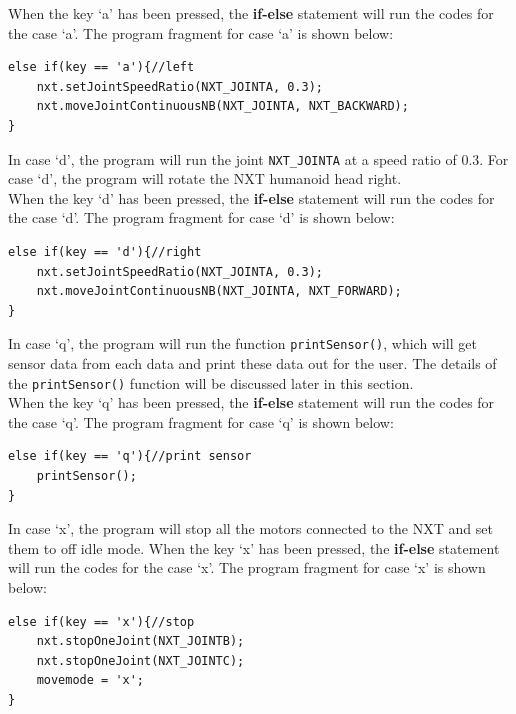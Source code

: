 \documentclass[11pt]{article}
\begin{document}
When the key `a' has been pressed, the {\bf if-else} statement will run 
the codes for the case `a'. The program fragment for case `a' is shown below:
\begin{lstlisting}
else if(key == 'a'){//left
    nxt.setJointSpeedRatio(NXT_JOINTA, 0.3);
    nxt.moveJointContinuousNB(NXT_JOINTA, NXT_BACKWARD);
}
\end{lstlisting}
In case `d', the program will run the joint {\tt NXT\_JOINTA} at a speed ratio 
of 0.3. For case `d', the program will rotate the NXT humanoid head right.\\

When the key `d' has been pressed, the {\bf if-else} statement will run 
the codes for the case `d'. The program fragment for case `d' is shown below:
\begin{lstlisting}
else if(key == 'd'){//right
    nxt.setJointSpeedRatio(NXT_JOINTA, 0.3);
    nxt.moveJointContinuousNB(NXT_JOINTA, NXT_FORWARD);
}
\end{lstlisting}
In case `q', the program will run the function {\tt printSensor()}, which will 
get sensor data from each data and print these data out for the user. The details 
of the {\tt printSensor()} function will be discussed later in this section.\\

When the key `q' has been pressed, the {\bf if-else} statement will run 
the codes for the case `q'. The program fragment for case `q' is shown below:
\begin{lstlisting}
else if(key == 'q'){//print sensor
    printSensor();
}
\end{lstlisting}
In case `x', the program will stop all the motors connected to the NXT and set 
them to off idle mode. When the key `x' has been pressed, the {\bf if-else} 
statement will run the codes for the case `x'. The program fragment for case `x' 
is shown below:
\begin{lstlisting}
else if(key == 'x'){//stop
    nxt.stopOneJoint(NXT_JOINTB);
    nxt.stopOneJoint(NXT_JOINTC);
    movemode = 'x';
}
\end{lstlisting}
\end{document}
